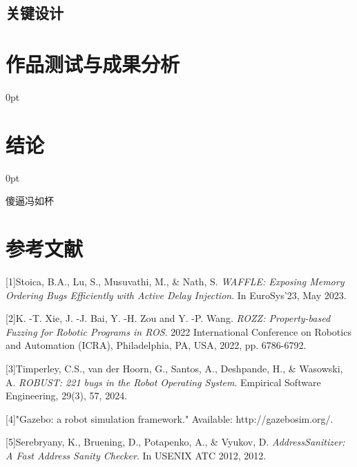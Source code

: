 \documentclass[zihao=-4]{ctexart}
\newcommand{\setParDis}{\setlength {\parskip} {0pt} }
\begin{document}
\begin{spacing}{1.5}
\subsection{关键设计} %


\section{作品测试与成果分析} %
\setParDis %




\section*{结论}%
\setParDis %
傻逼冯如杯


\end{spacing}
\newpage

\section*{参考文献} %
[1]Stoica, B.A., Lu, S., Musuvathi, M., \& Nath, S. \textit{WAFFLE: Exposing Memory Ordering Bugs Efficiently with Active Delay Injection}. In EuroSys'23, May 2023. 

[2]K. -T. Xie, J. -J. Bai, Y. -H. Zou and Y. -P. Wang. \textit{ROZZ: Property-based Fuzzing for Robotic Programs in ROS}. 2022 International Conference on Robotics and Automation (ICRA), Philadelphia, PA, USA, 2022, pp. 6786-6792.

[3]Timperley, C.S., van der Hoorn, G., Santos, A., Deshpande, H., \& Wasowski, A. \textit{ROBUST: 221 bugs in the Robot Operating System}. Empirical Software Engineering, 29(3), 57, 2024.

[4]"Gazebo: a robot simulation framework." Available: http://gazebosim.org/.

[5]Serebryany, K., Bruening, D., Potapenko, A., \& Vyukov, D. \textit{AddressSanitizer: A Fast Address Sanity Checker}. In USENIX ATC 2012, 2012.
\end{document}
